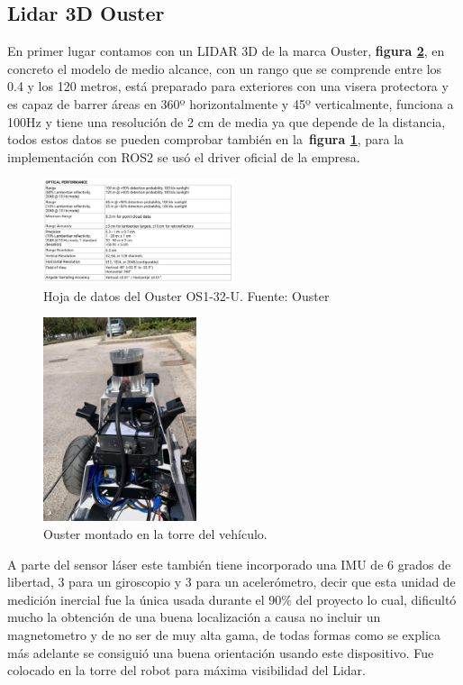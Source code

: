 \subsection{Lidar 3D Ouster}
En primer lugar contamos con un LIDAR 3D de la marca Ouster, \textbf{figura \ref{fig:ouster_hunter}}, en concreto el 
modelo de medio alcance, con un rango que se comprende entre los 0.4 y los 120 metros, está preparado para exteriores con una visera 
protectora y es capaz de barrer áreas en 360º horizontalmente y 45º verticalmente, funciona a 
100Hz y tiene una resolución de 2 cm de media ya que depende de la distancia, todos estos datos se pueden comprobar también en la~\textbf{figura \ref{fig:datasheet_ouster}}, 
para la implementación con ROS2 se usó el driver oficial de la empresa. 

\begin{figure}[h]
    \centering
    \includegraphics[width=0.5\textwidth]{images/osuter_datasheet.png}
    \caption{Hoja de datos del Ouster OS1-32-U. Fuente: Ouster}
    \label{fig:datasheet_ouster}
\end{figure}

\begin{figure}[H]
    \centering
    \includegraphics[width=0.4\textwidth]{images/ouster_hunter.jpeg}
    \caption{Ouster montado en la torre del vehículo.}
    \label{fig:ouster_hunter}
\end{figure}

A parte del sensor láser este también tiene incorporado una IMU de 6 grados de libertad, 3 para un giroscopio y 3 para un acelerómetro, 
decir que esta unidad de medición inercial fue la única usada durante el 90\% del proyecto lo cual, dificultó mucho la obtención de una 
buena localización a causa no incluir un magnetometro y de no ser de muy alta gama, de todas formas como se explica más adelante se 
consiguió una buena orientación usando este dispositivo. Fue colocado en la torre del robot para máxima visibilidad del Lidar.

